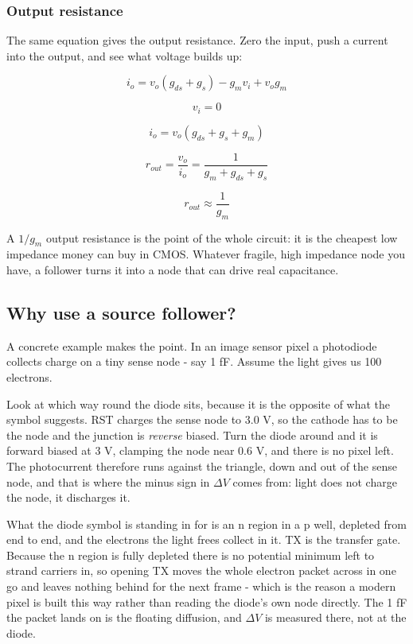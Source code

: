 \subsubsection{Output resistance}\label{output-resistance}

The same equation gives the output resistance. Zero the input, push a
current into the output, and see what voltage builds up:

\[ i_o = v_o (g_{ds} + g_{s}) - g_{m} v_i + v_o g_m \]

\[v_i = 0\]

\[ i_o = v_o (g_{ds} + g_{s} + g_m) \]

\[ r_{out} = \frac{v_o}{i_o} = \frac{1}{g_m + g_{ds} + g_{s}} \]

\[ r_{out} \approx \frac{1}{g_m}\]

A \(1/g_m\) output resistance is the point of the whole circuit: it is
the cheapest low impedance money can buy in CMOS. Whatever fragile, high
impedance node you have, a follower turns it into a node that can drive
real capacitance.

\subsection{Why use a source follower?}\label{why-use-a-source-follower}

A concrete example makes the point. In an image sensor pixel a
photodiode collects charge on a tiny sense node - say 1 fF. Assume the
light gives us 100 electrons.

Look at which way round the diode sits, because it is the opposite of
what the symbol suggests. RST charges the sense node to 3.0 V, so the
cathode has to be the node and the junction is \emph{reverse} biased.
Turn the diode around and it is forward biased at 3 V, clamping the node
near 0.6 V, and there is no pixel left. The photocurrent therefore runs
against the triangle, down and out of the sense node, and that is where
the minus sign in \(\Delta V\) comes from: light does not charge the
node, it discharges it.

What the diode symbol is standing in for is an n region in a p well,
depleted from end to end, and the electrons the light frees collect in
it. TX is the transfer gate. Because the n region is fully depleted
there is no potential minimum left to strand carriers in, so opening TX
moves the whole electron packet across in one go and leaves nothing
behind for the next frame - which is the reason a modern pixel is built
this way rather than reading the diode's own node directly. The 1 fF the
packet lands on is the floating diffusion, and \(\Delta V\) is measured
there, not at the diode.

